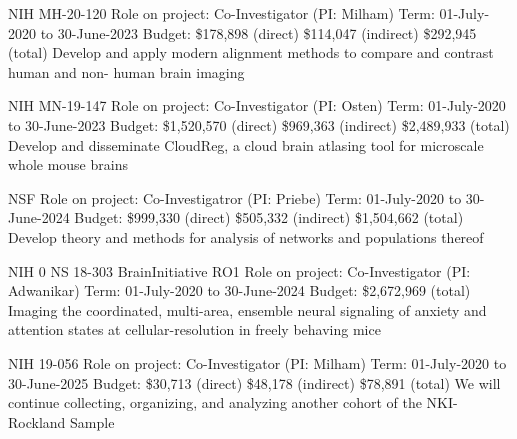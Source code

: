 \documentclass[10pt,colorlinks=true,urlcolor=blue]{moderncv}
\begin{document}
{\newline NIH MH-20-120
\newline Role on project: Co-Investigator (PI: Milham)
\newline Term: 01-July-2020 to 30-June-2023
\newline Budget: \$178,898 (direct) \$114,047 (indirect) \$292,945 (total)
\newline Develop and apply modern alignment methods to compare and contrast human and non-
human brain imaging}{}{}{}{}

{\newline NIH MN-19-147
\newline Role on project: Co-Investigator (PI: Osten)
\newline Term: 01-July-2020 to 30-June-2023
\newline Budget: \$1,520,570 (direct) \$969,363 (indirect) \$2,489,933 (total)
\newline Develop and disseminate CloudReg, a cloud brain atlasing tool for microscale whole
mouse brains}{}{}{}{}

{\newline NSF
\newline Role on project: Co-Investigatror (PI: Priebe)
\newline Term: 01-July-2020 to 30-June-2024
\newline Budget: \$999,330 (direct) \$505,332 (indirect) \$1,504,662 (total)
\newline Develop theory and methods for analysis of networks and populations thereof}{}{}{}{}

{\newline NIH 0 NS 18-303 BrainInitiative RO1
\newline Role on project: Co-Investigator (PI: Adwanikar)
\newline Term: 01-July-2020 to 30-June-2024
\newline Budget: \$2,672,969 (total)
\newline Imaging the coordinated, multi-area, ensemble neural signaling of anxiety and attention
states at cellular-resolution in freely behaving mice}{}{}{}{}

{\newline NIH 19-056
\newline Role on project: Co-Investigator (PI: Milham)
\newline Term: 01-July-2020 to 30-June-2025
\newline Budget: \$30,713 (direct) \$48,178 (indirect) \$78,891 (total)
\newline We will continue collecting, organizing, and analyzing another cohort of the NKI-Rockland
Sample}{}{}{}{}
\end{document}

